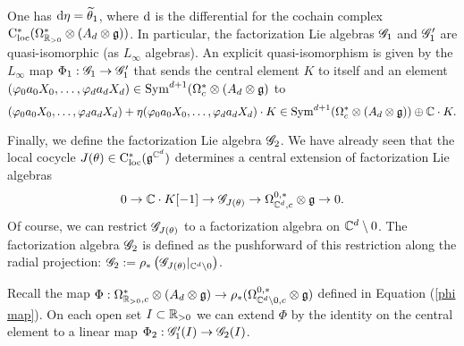 \documentclass[10pt]{amsart}
\begin{document}
\begin{lem} One has ${\rm d} \eta = \widetilde{\theta}_1$, where ${\rm d}$ is the differential for the cochain complex ${\rm C}_{\rm loc}^*(\Omega^*_{\mathbb R_{>0}} \otimes (A_d \otimes \mathfrak g))$. In particular, the factorization Lie algebras $\mathscr G_1$ and $\mathscr G_1'$ are quasi-isomorphic (as $L_\infty$ algebras). An explicit quasi-isomorphism is given by the $L_\infty$ map $\Phi_1 : \mathscr G_1 \to \mathscr G_1'$ that sends the central element $K$ to itself and an element $(\varphi_0 a_0 X_0,\ldots, \varphi_d a_d X_d) \in {\rm Sym}^{d+1}(\Omega^*_c \otimes (A_d \otimes \mathfrak g)$ to 
\[
(\varphi_0 a_0 X_0,\ldots, \varphi_d a_d X_d) + \eta(\varphi_0 a_0 X_0,\ldots, \varphi_d a_d X_d)\cdot K \in {\rm Sym}^{d+1}(\Omega^*_c \otimes (A_d \otimes \mathfrak g)) \oplus \mathbb C \cdot K .
\]
\end{lem}

Finally, we define the factorization Lie algebra $\mathscr G_2$. We have already seen that the local cocycle $J(\theta) \in {\rm C}_{\rm loc}^*(\mathfrak g^{\mathbb C^d})$ determines a central extension of factorization Lie algebras
\[
0 \to \mathbb C \cdot K[-1] \to \mathscr G_{J(\theta)} \to \Omega^{0,*}_{\mathbb C^d,c} \otimes \mathfrak g \to 0 .
\]
Of course, we can restrict $\mathscr G_{J(\theta)}$ to a factorization algebra on $\mathbb C^d \setminus 0$. The factorization algebra $\mathscr G_2$ is defined as the pushforward of this restriction along the radial projection: $\mathscr G_2 := \rho_* \left(\mathscr G_{J(\theta)}|_{\mathbb C^d \setminus 0}\right)$. 

Recall the map $\Phi : \Omega^*_{\mathbb R_{>0},c} \otimes (A_d \otimes \mathfrak g) \to \rho_*(\Omega^{0,*}_{\mathbb C^d \setminus 0,c} \otimes \mathfrak g)$ defined in Equation (\ref{phi map}). On each open set $I \subset \mathbb R_{>0}$ we can extend $\Phi$ by the identity on the central element to a linear map $\Phi_2 : \mathscr G_1' (I) \to \mathscr G_2 (I)$. 
\end{document}
